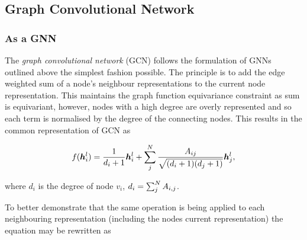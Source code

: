 






\subsection{Graph Convolutional Network}



\subsubsection{As a GNN}

The \emph{graph convolutional network} (GCN) follows the formulation of GNNs outlined above the simplest fashion possible.
The principle is to add the edge weighted sum of a node's neighbour representations to the current node representation.
This maintains the graph function equivariance constraint as sum is equivariant, however, nodes with a high degree are overly represented and so each term is normalised by the degree of the connecting nodes.
This results in the common representation of GCN as

\begin{equation}
    f({\bm{h}}_i^l) = \frac1{d_i + 1}{\bm{h}}_i^l + \sum_j^N\frac{{A}_{ij}}{\sqrt{(d_i + 1)(d_j + 1)}}{\bm{h}}_j^{l},
\end{equation}

where $d_i$ is the degree of node $v_i$, $d_i = \sum_j^N {A}_{i,j}$.

To better demonstrate that the same operation is being applied to each neighbouring representation (including the nodes current representation) the equation may be rewritten as

